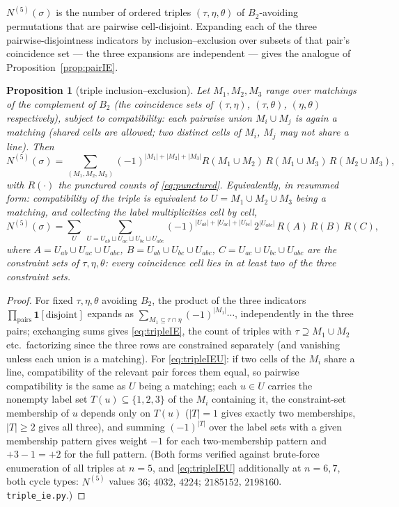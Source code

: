 \documentclass[11pt]{article}
\newtheorem{proposition}[theorem]{Proposition}
\theoremstyle{definition}
\begin{document}
$N^{(5)}(\sigma)$ is the number of ordered triples $(\tau,\eta,\theta)$
of $B_2$-avoiding permutations that are pairwise cell-disjoint.
Expanding each of the three pairwise-disjointness indicators by
inclusion--exclusion over subsets of that pair's coincidence set --- the
three expansions are independent --- gives the analogue of
Proposition~\ref{prop:pairIE}.

\begin{proposition}[triple inclusion--exclusion]\label{prop:tripleIE}
Let $M_1,M_2,M_3$ range over matchings of the complement of $B_2$
(the coincidence sets of $(\tau,\eta)$, $(\tau,\theta)$,
$(\eta,\theta)$ respectively), subject to \emph{compatibility}: each
pairwise union $M_i\cup M_j$ is again a matching (shared cells are
allowed; two distinct cells of $M_i$, $M_j$ may not share a line).
Then
\begin{equation}\label{eq:tripleIE}
N^{(5)}(\sigma)=\sum_{(M_1,M_2,M_3)}(-1)^{|M_1|+|M_2|+|M_3|}
R(M_1{\cup}M_2)\,R(M_1{\cup}M_3)\,R(M_2{\cup}M_3),
\end{equation}
with $R(\cdot)$ the punctured counts of \eqref{eq:punctured}.
Equivalently, in resummed form: compatibility of the triple is
equivalent to $U=M_1\cup M_2\cup M_3$ being a matching, and collecting
the label multiplicities cell by cell,
\begin{equation}\label{eq:tripleIEU}
N^{(5)}(\sigma)=\sum_{U}\ \sum_{U=U_{ab}\sqcup U_{ac}\sqcup U_{bc}\sqcup U_{abc}}
(-1)^{|U_{ab}|+|U_{ac}|+|U_{bc}|}\,2^{|U_{abc}|}\,
R(A)\,R(B)\,R(C),
\end{equation}
where $A=U_{ab}\cup U_{ac}\cup U_{abc}$,
$B=U_{ab}\cup U_{bc}\cup U_{abc}$, $C=U_{ac}\cup U_{bc}\cup U_{abc}$
are the constraint sets of $\tau,\eta,\theta$: \emph{every coincidence
cell lies in at least two of the three constraint sets}.
\end{proposition}

\begin{proof}
For fixed $\tau,\eta,\theta$ avoiding $B_2$, the product of the three
indicators $\prod_{\text{pairs}}\mathbf 1[\text{disjoint}]$ expands as
$\sum_{M_1\subseteq\tau\cap\eta}(-1)^{|M_1|}\cdots$, independently in
the three pairs; exchanging sums gives \eqref{eq:tripleIE}, the count of
triples with $\tau\supseteq M_1\cup M_2$ etc.\ factorizing since the
three rows are constrained separately (and vanishing unless each union
is a matching).  For \eqref{eq:tripleIEU}: if two cells of the $M_i$
share a line, compatibility of the relevant pair forces them equal, so
pairwise compatibility is the same as $U$ being a matching; each
$u\in U$ carries the nonempty label set $T(u)\subseteq\{1,2,3\}$ of the
$M_i$ containing it, the constraint-set membership of $u$ depends only
on $T(u)$ ($|T|=1$ gives exactly two memberships, $|T|\ge2$ gives all
three), and summing $(-1)^{|T|}$ over the label sets with a given
membership pattern gives weight $-1$ for each two-membership pattern
and $+3-1=+2$ for the full pattern.
(Both forms verified against brute-force enumeration of all triples at
$n=5$, and \eqref{eq:tripleIEU} additionally at $n=6,7$, both cycle
types: $N^{(5)}$ values $36$; $4032$, $4224$; $2185152$, $2198160$.
\texttt{triple\_ie.py}.)
\end{proof}
\end{document}
